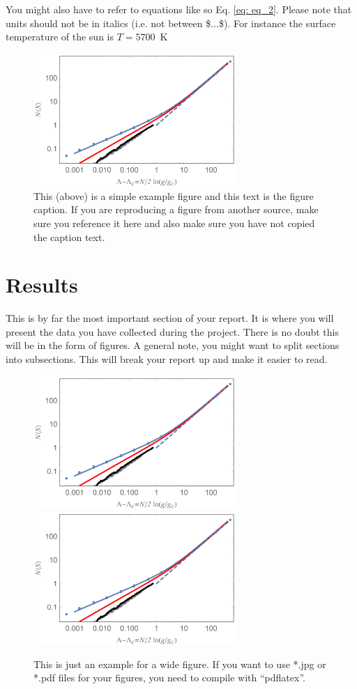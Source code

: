 \documentclass[a4paper,12pt, notitlepage]{article}
\begin{document}
You might also have to refer to equations like so Eq. \eqref{eq: eq_2}. Please note that units should not be in italics (i.e. not between \$...\$). For instance the surface temperature of the sun is $T = 5700$~K

\begin{figure}[t]
\centering
\includegraphics[width=77mm]{pngexample.png}
\caption{\small This (above) is a simple example figure and this text is the figure caption. If you are reproducing a figure from another source, make sure you reference it here and also make sure you have not copied the caption text.}
\label{fig: fig_1}
\end{figure}

\section{Results}
This is by far the most important section of your report. It is where you will present the data you have collected during the project. There is no doubt this will be in the form of figures. A general note, you might want to split sections into subsections. This will break your report up and make it easier to read.

\begin{figure}[]
\centering
\includegraphics[width=77mm]{pngexample.png} \hspace{3mm}
\includegraphics[width=77mm]{pngexample.png}
\caption{\small This is just an example for a wide figure.
                If you want to use *.jpg or *.pdf files
                for your figures, you need to compile with
                ``pdflatex''.}
\label{fig: fig_2}
\end{figure}
\end{document}
